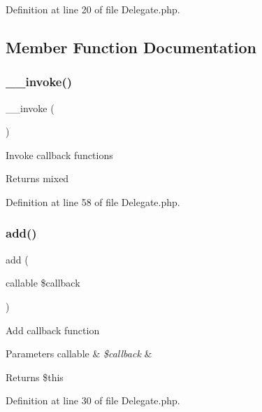 Definition at line 20 of file Delegate.\+php.



\subsection{Member Function Documentation}
\mbox{\label{class_delegate_a9aac7e1475efe923de4e19cc2511f092}} 
\subsubsection{\texorpdfstring{\+\_\+\+\_\+invoke()}{\_\_invoke()}}
{\footnotesize\ttfamily \+\_\+\+\_\+invoke (\begin{DoxyParamCaption}{ }\end{DoxyParamCaption})}

Invoke callback functions \begin{DoxyReturn}{Returns}
mixed 
\end{DoxyReturn}


Definition at line 58 of file Delegate.\+php.

\mbox{\label{class_delegate_a2db8611725175f0ef569cb2ee7d1ef24}} 
\subsubsection{\texorpdfstring{add()}{add()}}
{\footnotesize\ttfamily add (\begin{DoxyParamCaption}\item[{callable}]{\$callback }\end{DoxyParamCaption})}

Add callback function 
\begin{DoxyParams}[1]{Parameters}
callable & {\em \$callback} & \\
\hline
\end{DoxyParams}
\begin{DoxyReturn}{Returns}
\$this 
\end{DoxyReturn}


Definition at line 30 of file Delegate.\+php.

\mbox{\label{class_delegate_aba650b6c889c96ddacd660d1e4e1a1d7}} 
